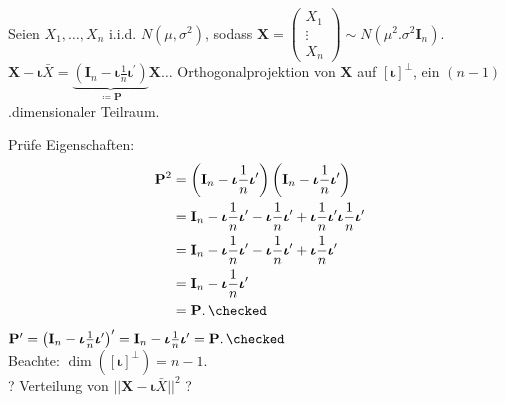 \documentclass{tstextbook}
\begin{document}
\begin{example}
	
	Seien $ X_1, \ldots, X_n $ i.i.d. $ N(\mu, \sigma^2) $, sodass $ \mathbf{X} = \begin{pmatrix}
		X_1 \\ \vdots \\ X_n
	\end{pmatrix} \sim N(\mu^2. \sigma^2 \mathbf{I}_n) $. \\
	
	$ \mathbf{X} - \boldsymbol{\iota}\bar{X}  = \underbrace{\left(\mathbf{I}_n - \boldsymbol{\iota} \frac{1}{n} \boldsymbol{\iota}^\prime\right)}_{\coloneqq \mathbf{P}} \mathbf{X} \ldots $ Orthogonalprojektion von $ \mathbf{X} $ auf $ [\boldsymbol{\iota}]^\perp $, ein $ (n-1) $.dimensionaler Teilraum.
	
	Prüfe Eigenschaften: 
	\[
	\begin{aligned}
		\mathbf{P}^2 & = \left(\mathbf{I}_n - \boldsymbol{\iota} \frac{1}{n} \boldsymbol{\iota}^\prime\right)\left(\mathbf{I}_n - \boldsymbol{\iota} \frac{1}{n} \boldsymbol{\iota}^\prime\right) \\
		& = \mathbf{I}_n - \boldsymbol{\iota} \frac{1}{n} \boldsymbol{\iota}^\prime - \boldsymbol{\iota} \frac{1}{n} \boldsymbol{\iota}^\prime + \boldsymbol{\iota} \frac{1}{n} \boldsymbol{\iota}^\prime \boldsymbol{\iota} \frac{1}{n} \boldsymbol{\iota}^\prime \\
		& = \mathbf{I}_n - \boldsymbol{\iota} \frac{1}{n} \boldsymbol{\iota}^\prime - \boldsymbol{\iota} \frac{1}{n}\boldsymbol{\iota}^\prime + \boldsymbol{\iota} \frac{1}{n} \boldsymbol{\iota}^\prime \\
		& = \mathbf{I}_n - \boldsymbol{\iota} \frac{1}{n} \boldsymbol{\iota}^\prime \\
		& = \mathbf{P}. \, \checked
	\end{aligned}
	\]
	$ \mathbf{P}^\prime = \left(\mathbf{I}_n - \boldsymbol{\iota} \frac{1}{n} \boldsymbol{\iota}^\prime\right)^\prime = \mathbf{I}_n - \boldsymbol{\iota} \frac{1}{n} \boldsymbol{\iota}^\prime = \mathbf{P}. \, \checked $ \\
	Beachte: $  \dim\left([\boldsymbol{\iota}]^\perp\right) = n-1 $. \\
	
	? Verteilung von $ ||\mathbf{X}-\boldsymbol{\iota} \bar{X}||^2 $ ? \\
	

\end{example}
\end{document}
